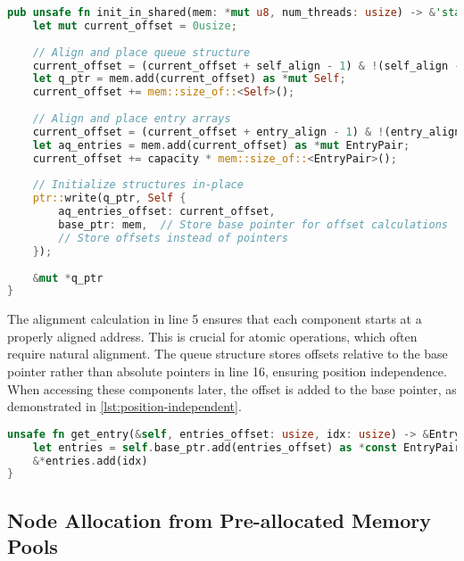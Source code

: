 \begin{lstlisting}[language=Rust, style=boxed, caption={Memory layout initialization in WCQueue}, label={lst:wcqueue-init}]
pub unsafe fn init_in_shared(mem: *mut u8, num_threads: usize) -> &'static mut Self {
    let mut current_offset = 0usize;
    
    // Align and place queue structure
    current_offset = (current_offset + self_align - 1) & !(self_align - 1);
    let q_ptr = mem.add(current_offset) as *mut Self;
    current_offset += mem::size_of::<Self>();
    
    // Align and place entry arrays
    current_offset = (current_offset + entry_align - 1) & !(entry_align - 1);
    let aq_entries = mem.add(current_offset) as *mut EntryPair;
    current_offset += capacity * mem::size_of::<EntryPair>();
    
    // Initialize structures in-place
    ptr::write(q_ptr, Self {
        aq_entries_offset: current_offset,
        base_ptr: mem,  // Store base pointer for offset calculations
        // Store offsets instead of pointers
    });
    
    &mut *q_ptr
}
\end{lstlisting}

The alignment calculation in line 5 ensures that each component starts at a properly aligned address. This is crucial for atomic operations, which often require natural alignment. The queue structure stores offsets relative to the base pointer rather than absolute pointers in line 16, ensuring position independence. When accessing these components later, the offset is added to the base pointer, as demonstrated in \cref{lst:position-independent}.

\begin{lstlisting}[language=Rust, style=boxed, caption={Position-independent component access}, label={lst:position-independent}]
unsafe fn get_entry(&self, entries_offset: usize, idx: usize) -> &EntryPair {
    let entries = self.base_ptr.add(entries_offset) as *const EntryPair;
    &*entries.add(idx)
}
\end{lstlisting}

\subsection{Node Allocation from Pre-allocated Memory Pools}

